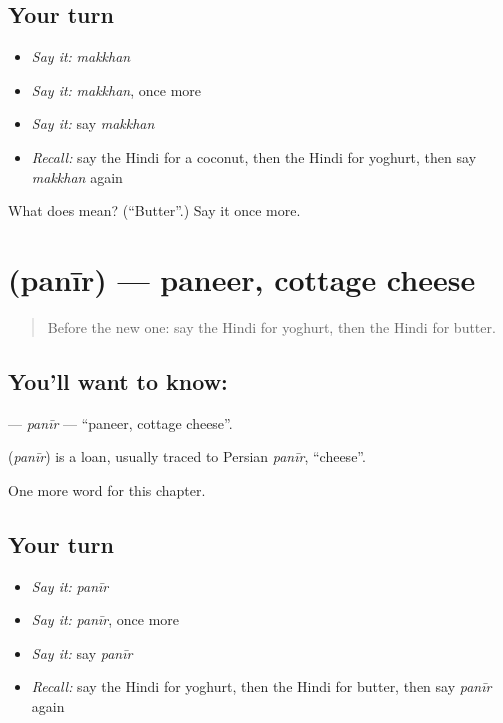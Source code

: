 \subsection*{Your turn}
\begin{itemize}
\raggedright
  \item \emph{Say it:} \emph{makkhan}
  \item \emph{Say it:} \emph{makkhan}, once more
  \item \emph{Say it:} say \emph{makkhan}
  \item \emph{Recall:} say the Hindi for a coconut, then the Hindi for yoghurt, then say \emph{makkhan} again
\end{itemize}

\begin{tcolorbox}[breakable,colback=teal!4,colframe=teal!35!black,title={Before you move on}]
What does  mean? (\textquotedblleft{}Butter\textquotedblright{}.) Say it once more.
\end{tcolorbox}
\section[\texorpdfstring{\hi{पनीर} (panīr)}{पनीर (panīr)}]{ (panīr) — paneer, cottage cheese}

\label{lesson:HI-C141-panir}



\begin{quote}
Before the new one: say the Hindi for yoghurt, then the Hindi for butter.
\end{quote}

\subsection*{You'll want to know: }
\textbf{} — \emph{panīr} — \textquotedblleft{}paneer, cottage cheese\textquotedblright{}.

\begin{cousinweb}
\textbf{} (\emph{panīr}) is a loan, usually traced to Persian \emph{panīr}, \textquotedblleft{}cheese\textquotedblright{}.
\end{cousinweb}

\begin{grammarlens}[title={What you've built}]
One more word for this chapter.
\end{grammarlens}

\subsection*{Your turn}
\begin{itemize}
\raggedright
  \item \emph{Say it:} \emph{panīr}
  \item \emph{Say it:} \emph{panīr}, once more
  \item \emph{Say it:} say \emph{panīr}
  \item \emph{Recall:} say the Hindi for yoghurt, then the Hindi for butter, then say \emph{panīr} again
\end{itemize}

